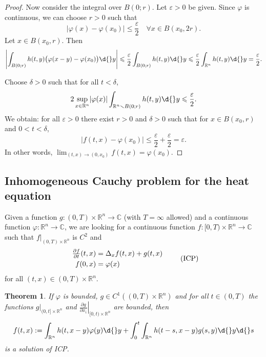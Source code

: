 \documentclass[12pt, oneside, a4paper]{article}
\newtheorem{thm}{Theorem}[section]
\theoremstyle{dfn}
\def\Rbb{\ensuremath{\mathbb{R}}}
\newcommand{\Com}{\mathbb{C}}
\providecommand{\abs}[1]{\lvert#1\rvert}
\providecommand{\absbig}[1]{\big\lvert#1\big\rvert}
\providecommand{\Abs}[1]{\left\lvert#1\right\rvert}
\begin{document}
\begin{proof}
Now consider the integral over $B(0;r)$. Let $\varepsilon > 0$ be given. Since $\varphi$ is continuous, we can choose $r > 0$ such that
\[
\absbig{\varphi(x) - \varphi(x_0)} \leqslant \frac{\varepsilon}{2} \quad \forall x \in B(x_0,2r).
\]
Let $x \in B(x_0,r)$. Then
\[
\Abs{\int_{B(0;r)} h(t,y) \big( \varphi(x-y) - \varphi(x_0) \big) \d{}y }
\leqslant \frac{\varepsilon}{2} \int_{B(0;r)} h(t,y) \d{}y
\leqslant \frac{\varepsilon}{2} \int_{\Rbb^n} h(t,y) \d{}y
= \frac{\varepsilon}{2}.
\]

Choose $\delta > 0$ such that for all $t < \delta$,
\[
2 \sup_{x \in \Rbb^n} \abs{\varphi(x)} \int_{\Rbb^n \smallsetminus B(0;r)} h(t,y) \d{}y
\leqslant \frac{\varepsilon}{2}.
\]
We obtain: for all $\varepsilon > 0$ there exist $r > 0$ and $\delta > 0$ such that for $x \in B(x_0,r)$ and $0 < t < \delta$,
\[
\absbig{f(t,x) - \varphi(x_0)}
\leqslant \frac{\varepsilon}{2} + \frac{\varepsilon}{2} = \varepsilon.
\]
In other words, $\lim_{(t,x) \to (0,x_0)} f(t,x) = \varphi(x_0)$.
\end{proof}

\subsection{Inhomogeneous Cauchy problem for the heat equation}

Given a function $g \colon (0,T) \times \Rbb^n \to \Com$ (with $T = \infty$ allowed) and a continuous function $\varphi \colon \Rbb^n \to \Com$, we are looking for a continuous function $f \colon [0,T) \times \Rbb^n \to \Com$ such that $f|_{(0,T) \times \Rbb^n}$ is $C^2$ and
\begin{equation*}
\begin{array}{r@{{}={}}l}
\frac{\partial f}{\partial t} (t,x) & \Delta_x f(t,x) + g(t,x) \\[3pt]
f(0,x) & \varphi(x)	
\end{array}
\tag{ICP}
\end{equation*}
for all $(t,x) \in (0,T) \times \Rbb^n$.

\begin{thm}\label{Theo:SolInhomCauchyForHeatEq}
If $\varphi$ is bounded, $g \in C^1((0,T) \times \Rbb^n)$ and for all $t \in (0,T)$ the functions $g|_{(0,t] \times \Rbb^n}$ and $\left.\frac{\partial g}{\partial x_i}\right|_{[0,t) \times \Rbb^n}$ are bounded, then
\[
f(t,x) :=
\int_{\Rbb^n} h(t,x-y) \varphi(y) \d{}y + \int_0^t \int_{\Rbb^n} h(t-s,x-y) g(s,y) \d{}y \d{}s
\]
is a solution of ICP.
\end{thm}
\end{document}
